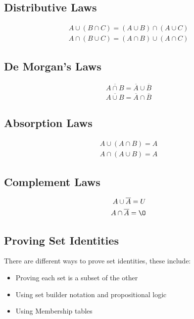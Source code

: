 \documentclass[12pt letter]{report}
\begin{document}
\subsection{Distributive Laws}

\begin{align*}
  A \cup \left( B \cap C \right)  = \left( A \cup B \right)  \cap \left( A \cup C \right) \\
  A \cap \left( B \cup C  \right)  = \left( A \cap B \right)  \cup \left( A \cap C \right)
\end{align*}

\subsection{De Morgan's Laws}
\begin{align*}
  \overline{A \cap  B} = \overline{A} \cup \overline{B} \\
  \overline{A \cup B } = \overline{A} \cap \overline{B}
\end{align*}

\subsection{Absorption Laws}
\begin{align*}
  A \cup \left( A \cap B \right) = A \\
  A \cap  \left( A \cup B  \right)  = A
\end{align*}

\subsection{Complement Laws}
\begin{align*}
  A \cup \overline{A} = U \\
  A \cap \overline{A} = \O
\end{align*}

\subsection{Proving Set Identities}

There are different ways to prove set identities, these include:
\begin{itemize}
  \item Proving each set is a subset of the other
  \item Using set builder notation and propositional logic
  \item Using Membership tables
\end{itemize}
\end{document}
